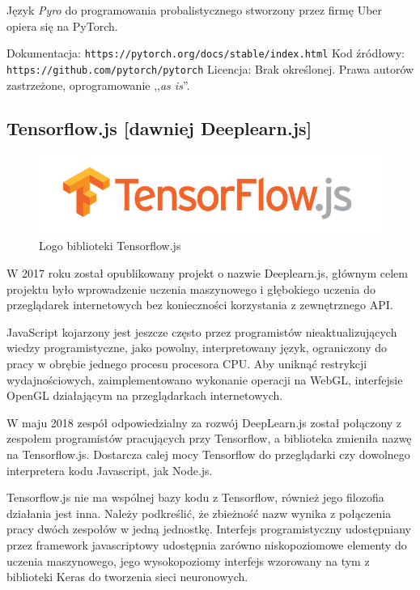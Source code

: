 \documentclass[12pt,a4paper,twoside,titlepage,openright]{book}
\begin{document}
\begin{itemize}
Język \textit{Pyro} do programowania probalistycznego stworzony przez firmę Uber opiera się na PyTorch.\cite{book:2226069}

\noindent
\newline
Dokumentacja: \texttt{https://pytorch.org/docs/stable/index.html}
\newline
Kod źródłowy: \texttt{https://github.com/pytorch/pytorch}
\newline
Licencja: Brak określonej. Prawa autorów zastrzeżone, oprogramowanie ,,\textit{as is}''.


\subsection{Tensorflow.js [dawniej Deeplearn.js]}
\begin{figure}[ht]
	\centering
			\includegraphics[resolution=100, scale=0.6]{TensorflowJS.png}
		\caption{Logo biblioteki Tensorflow.js}
\end{figure}

W 2017 roku został opublikowany projekt o nazwie Deeplearn.js, głównym celem projektu było wprowadzenie uczenia maszynowego i głębokiego uczenia do przeglądarek internetowych bez konieczności korzystania z zewnętrznego API.

JavaScript kojarzony jest jeszcze często przez programistów nieaktualizujących wiedzy programistyczne, jako powolny, interpretowany język, ograniczony do pracy w obrębie jednego procesu procesora CPU. \cite{siteSlowJavaScript} Aby uniknąć restrykcji wydajnościowych, zaimplementowano wykonanie operacji na WebGL, interfejsie OpenGL działającym na przeglądarkach internetowych.

W maju 2018 zespół odpowiedzialny za rozwój DeepLearn.js został połączony z zespołem programistów pracujących przy Tensorflow, a biblioteka zmieniła nazwę na Tensorflow.js. Dostarcza calej mocy Tensorflow do przeglądarki czy dowolnego interpretera kodu Javascript, jak Node.js.

Tensorflow.js nie ma wspólnej bazy kodu z Tensorflow, również jego filozofia działania jest inna. Należy podkreślić, że zbieżność nazw wynika z połączenia pracy dwóch zespołów w jedną jednostkę. Interfejs programistyczny udostępniany przez framework javascriptowy udostępnia zarówno niskopoziomowe elementy do uczenia maszynowego, jego wysokopoziomy interfejs wzorowany na tym z biblioteki Keras do tworzenia sieci neuronowych.


\end{itemize}
\end{document}
